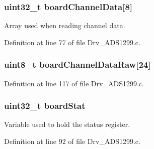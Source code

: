 \subsubsection[{\texorpdfstring{board\+Channel\+Data}{boardChannelData}}]{\setlength{\rightskip}{0pt plus 5cm}uint32\+\_\+t board\+Channel\+Data\mbox{[}8\mbox{]}}\hypertarget{group__ADS1299__Library_gad8303f3f7907884aa1ef5727220fd293}{}\label{group__ADS1299__Library_gad8303f3f7907884aa1ef5727220fd293}


Array used when reading channel data. 



Definition at line 77 of file Drv\+\_\+\+A\+D\+S1299.\+c.

\subsubsection[{\texorpdfstring{board\+Channel\+Data\+Raw}{boardChannelDataRaw}}]{\setlength{\rightskip}{0pt plus 5cm}uint8\+\_\+t board\+Channel\+Data\+Raw\mbox{[}24\mbox{]}}\hypertarget{group__ADS1299__Library_gaa891a075c92bada339ffdb3a6f8c5ac8}{}\label{group__ADS1299__Library_gaa891a075c92bada339ffdb3a6f8c5ac8}


Definition at line 117 of file Drv\+\_\+\+A\+D\+S1299.\+c.

\subsubsection[{\texorpdfstring{board\+Stat}{boardStat}}]{\setlength{\rightskip}{0pt plus 5cm}uint32\+\_\+t board\+Stat}\hypertarget{group__ADS1299__Library_ga50edda929d7766e162d89ec32181a93a}{}\label{group__ADS1299__Library_ga50edda929d7766e162d89ec32181a93a}


Variable used to hold the status register. 



Definition at line 92 of file Drv\+\_\+\+A\+D\+S1299.\+c.

